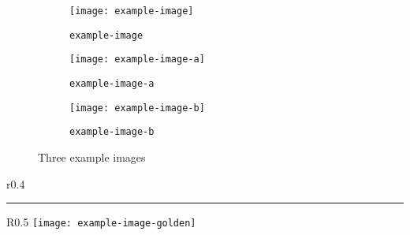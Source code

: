 \documentclass[12pt]{article}
\begin{document}
\begin{figure}[htb]
     \centering
     \begin{subfigure}[t]{0.3\textwidth}
         \centering
         \texttt{[image: example-image]}
         \cprotect\caption{\verb|example-image|}
         \label{fig:example}
     \end{subfigure}
     \hfill
     \begin{subfigure}[t]{0.3\textwidth}
         \centering
         \texttt{[image: example-image-a]}
         \cprotect\caption{\verb|example-image-a|}
         \label{fig:a}
     \end{subfigure}
     \hfill
     \begin{subfigure}[t]{0.3\textwidth}
         \centering
         \texttt{[image: example-image-b]}
         \cprotect\caption{\verb|example-image-b|}
         \label{fig:b}
     \end{subfigure}
        \caption{Three example images}
        \label{fig:three graphs}
\end{figure}

\lipsum[3]

\begin{wrapfigure}{r}{0.4\textwidth}                 %
        \centering
        \rule{4cm}{6cm}
        \cprotect\caption{Wraped figure using \verb|\begin{wrapfigure}|}           %
\end{wrapfigure}

\blindtext

\begin{wrapfigure}{R}{0.5\textwidth}                 
        \centering
        \texttt{[image: example-image-golden]}
        \caption{Image of Golden Ratio}
\end{wrapfigure}

\lipsum[1-4]



\end{document}
